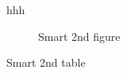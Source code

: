 hhh

\begin{figure}\caption{Smart 2nd figure}
\end{figure}

\begin{table}\caption{Smart 2nd table}\label{fig:fig-ref}
\end{table}


